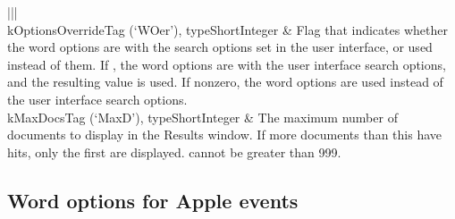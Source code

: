 \documentclass[letterpaper,12pt,english,openany,oneside]{sphinxmanual}
\begin{document}
\begin{savenotes}
\begin{tabular}[t]{|||}
\\
\hline
kOptionsOverrideTag (‘WOer’), typeShortInteger
&
Flag that indicates whether the word options are  with the search options set in the user interface, or used instead of them. If , the word options are  with the user interface search options, and the resulting value is used. If non\sphinxhyphen{}zero, the word options are used instead of the user interface search options.
\\
\hline
kMaxDocsTag (‘MaxD’), typeShortInteger
&
The maximum number of documents to display in the Results window. If more documents than this have hits, only the first  are displayed.  cannot be greater than 999.
\\
\hline
\end{tabular}
\par
\sphinxattableend\end{savenotes}




\subsection{Word options for Apple events}
\label{\detokenize{IAC_API_SearchIntro:word-options-for-apple-events}}
\end{document}
